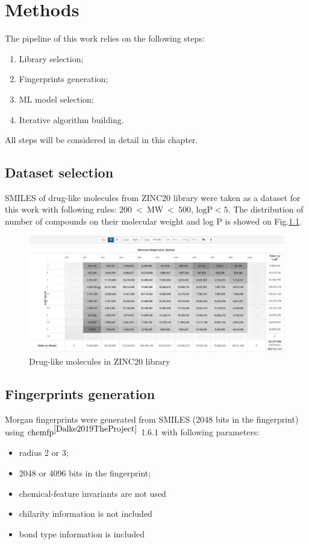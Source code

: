 \chapter{Methods}

The pipeline of this work relies on the following steps:
\begin{enumerate}
    \item Library selection;
    \item Fingerprints generation;
    \item ML model selection;
    \item Iterative algorithm building.
\end{enumerate}
All steps will be considered in detail in this chapter.
\section{Dataset selection}

SMILES of drug-like molecules from ZINC20 library were taken as a dataset for this work with following rules: $200\ <\ \text{MW}\ <\ 500$, $\text{logP} < 5$.
The distribution of number of compounds on their molecular weight and log P is showed on  Fig.\ref{zinc}.

\begin{figure}[H]
    \centering
    \includegraphics[scale=0.35]{Images/zinc.jpg}
    \caption{Drug-like molecules in ZINC20 library}
   \label{zinc}
\end{figure}

\section{Fingerprints generation}

Morgan fingerprints were generated from SMILES (2048 bits in the fingerprint) using $\text{chemfp}^{\cite{Dalke2019TheProject}}$ 1.6.1 with following parameters:
\begin{itemize}
    \item radius 2 or 3;
    \item 2048 or 4096 bits in the fingerprint;
    \item chemical-feature invariants are not used
    \item chilarity information is not included
    \item bond type information is included
\end{itemize}

